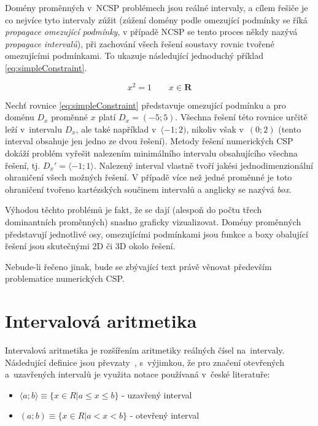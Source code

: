 Domény proměnných v~NCSP problémech jsou reálné intervaly, a cílem řešiče je co nejvíce tyto intervaly zúžit (zúžení domény podle omezující podmínky se říká \emph{propagace omezující podmínky}, v případě NCSP se tento proces někdy nazývá \emph{propagace intervalů}), při zachování všech řešení soustavy rovnic tvořené omezujícími podmínkami. To ukazuje následující jednoduchý příklad \ref{eq:simpleConstraint}.

\begin{equation} \label{eq:simpleConstraint}
x^2 = 1\qquad x \in \boldsymbol{R}
\end{equation}

Nechť rovnice \ref{eq:simpleConstraint} představuje omezující podmínku a pro doménu $D_x$ proměnné $x$ platí $D_x = (-5;5)$. Všechna řešení této rovnice určitě leží v~intervalu $D_x$, ale také například v~$\langle -1;2)$, nikoliv však v~$(0;2)$ (tento interval obsahuje jen jedno ze dvou řešení). Metody řešení numerických CSP dokáží problém vyřešit nalezením minimálního intervalu obsahujícího všechna řešení, tj. $D_x' = \langle -1;1\rangle$. Nalezený interval vlastně tvoří jakési jednodimenzionální ohraničení všech možných řešení. V případě více než jedné proměnné je toto ohraničení tvořeno kartézských součinem intervalů a anglicky se nazývá \emph{box}.

Výhodou těchto problémů je fakt, že se dají (alespoň do počtu třech dominantních proměnných) snadno graficky vizualizovat. Domény proměnných představují jednotlivé osy, omezujícími podmínkami jsou funkce a boxy obalující řešení jsou skutečnými 2D či 3D  okolo řešení.

Nebude-li řečeno jinak, bude se zbývající text právě věnovat především problematice numerických CSP.



\section{Intervalová aritmetika}
\label{ch:interval_arithmetic}
Intervalová aritmetika je rozšířením aritmetiky reálných čísel na~intervaly. Následující definice jsou převzaty~\cite{Moore:09}, s~výjimkou, že pro značení otevřených a~uzavřených intervalů je využita notace používaná v~české literatuře:

\begin{itemize}
    \item $\langle a;b \rangle \equiv \{x \in R | a \le x \le b \} $ - uzavřený interval
    \item $(a;b) \equiv \{ x \in R | a < x < b \}$ - otevřený interval
\end{itemize}

